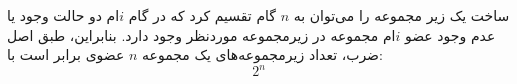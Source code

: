 ساخت یک زیر مجموعه را می‌توان به
$n$
گام تقسیم کرد که در گام
$i$ام
دو حالت وجود یا عدم وجود عضو
$i$ام
مجموعه در زیرمجموعه موردنظر وجود دارد.
بنابراین، طبق اصل ضرب، تعداد زیرمجموعه‌های یک مجموعه
$n$
عضوی برابر است با:
$$2^n$$